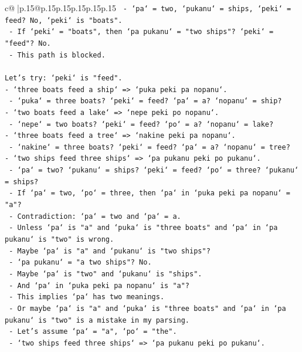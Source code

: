 \documentclass{article}
\begin{document}
{\begin{supertabular}{c@{$\;$}|p{.15\linewidth}@{}p{.15\linewidth}p{.15\linewidth}p{.15\linewidth}p{.15\linewidth}p{.15\linewidth}}
{{{\texttt{  {-} `pa` = two, `pukanu` = ships, `peki` = feed? No, `peki` is "boats".} \\
\texttt{  {-} If `peki` = "boats", then `pa pukanu` = "two ships"? `peki` = "feed"? No.} \\
\texttt{  {-} This path is blocked.} \\
\\ 
\texttt{Let's try: `peki` is "feed".} \\
\texttt{{-} `three boats feed a ship` => `puka peki pa nopanu`.} \\
\texttt{  {-} `puka` = three boats? `peki` = feed? `pa` = a? `nopanu` = ship?} \\
\texttt{{-} `two boats feed a lake` => `nepe peki po nopanu`.} \\
\texttt{  {-} `nepe` = two boats? `peki` = feed? `po` = a? `nopanu` = lake?} \\
\texttt{{-} `three boats feed a tree` => `nakine peki pa nopanu`.} \\
\texttt{  {-} `nakine` = three boats? `peki` = feed? `pa` = a? `nopanu` = tree?} \\
\texttt{{-} `two ships feed three ships` => `pa pukanu peki po pukanu`.} \\
\texttt{  {-} `pa` = two? `pukanu` = ships? `peki` = feed? `po` = three? `pukanu` = ships?} \\
\texttt{  {-} If `pa` = two, `po` = three, then `pa` in `puka peki pa nopanu` = "a"?} \\
\texttt{  {-} Contradiction: `pa` = two and `pa` = a.} \\
\texttt{  {-} Unless `pa` is "a" and `puka` is "three boats" and `pa` in `pa pukanu` is "two" is wrong.} \\
\texttt{  {-} Maybe `pa` is "a" and `pukanu` is "two ships"?} \\
\texttt{  {-} `pa pukanu` = "a two ships"? No.} \\
\texttt{  {-} Maybe `pa` is "two" and `pukanu` is "ships".} \\
\texttt{  {-} And `pa` in `puka peki pa nopanu` is "a"?} \\
\texttt{  {-} This implies `pa` has two meanings.} \\
\texttt{  {-} Or maybe `pa` is "a" and `puka` is "three boats" and `pa` in `pa pukanu` is "two" is a mistake in my parsing.} \\
\texttt{  {-} Let's assume `pa` = "a", `po` = "the".} \\
\texttt{  {-} `two ships feed three ships` => `pa pukanu peki po pukanu`.} \\
}}}
\end{supertabular}}
\end{document}
